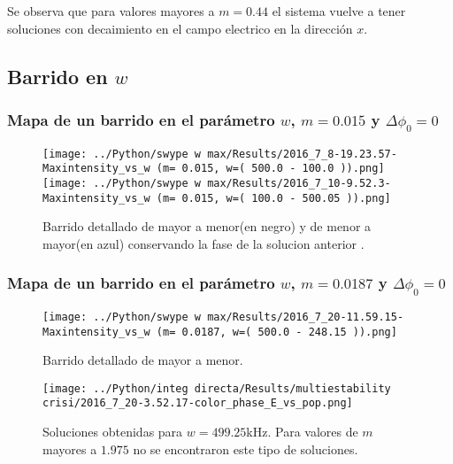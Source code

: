 		Se observa que para valores mayores a $m=0.44$ el sistema vuelve a tener soluciones con decaimiento en el campo electrico en la dirección $x$.		
				
				
	\subsection{Barrido en $w$}
	
	
	
	
	\subsubsection{Mapa de un barrido en el parámetro $w$, $m=0.015$ y $\Delta \phi_0=0$}			 		
	
	\begin{figure}[htp]
		\begin{center}
			\texttt{[image: ../Python/swype w max/Results/2016\_7\_8-19.23.57-Maxintensity\_vs\_w (m= 0.015, w=( 500.0 - 100.0 )).png]}
			\texttt{[image: ../Python/swype w max/Results/2016\_7\_10-9.52.3-Maxintensity\_vs\_w (m= 0.015, w=( 100.0 - 500.05 )).png]}	
		\end{center}
		\caption{Barrido detallado de mayor a menor(en negro) y de menor a mayor(en azul) conservando la fase de la solucion anterior .}
	\end{figure}	
	
	
		\subsubsection{Mapa de un barrido en el parámetro $w$, $m=0.0187$ y $\Delta \phi_0=0$}			 
		
			\begin{figure}[H]
				\begin{center}
					\texttt{[image: ../Python/swype w max/Results/2016\_7\_20-11.59.15-Maxintensity\_vs\_w (m= 0.0187, w=( 500.0 - 248.15 )).png]}
				\end{center}
				\caption{Barrido detallado de mayor a menor.}
			\end{figure}	
			
			
			\begin{figure}[htp]
				\begin{center}
					\texttt{[image: ../Python/integ directa/Results/multiestability crisi/2016\_7\_20-3.52.17-color\_phase\_E\_vs\_pop.png]}
				\end{center}
				\caption{Soluciones obtenidas para $w=499.25$kHz. Para valores de $m$ mayores a $1.975$ no se encontraron este tipo de soluciones.}
			\end{figure}		
		
